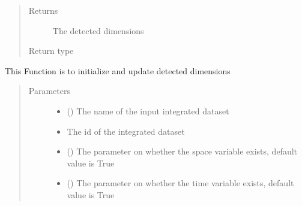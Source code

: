 \documentclass[letterpaper,10pt,english]{sphinxmanual}
\begin{document}
\begin{fulllineitems}
\begin{fulllineitems}
\begin{quote}
\begin{description}
\begin{itemize}
\end{itemize}

\item[{Returns}] \leavevmode
The detected dimensions

\item[{Return type}] \leavevmode
{}

\end{description}\end{quote}

\end{fulllineitems}


\begin{fulllineitems}
\label{\detokenize{AgentTools.util:AgentTools.util.OutputUtil.OutputUtil.check_dimensions_var}}
This Function is to initialize and update detected dimensions
\begin{quote}\begin{description}
\item[{Parameters}] \leavevmode\begin{itemize}
\item {} 
 () \textendash{} The name of the input integrated dataset

\item {} 
 \textendash{} The id of the integrated dataset

\item {} 
 () \textendash{} The parameter on whether the space variable exists, default value is True

\item {} 
 () \textendash{} The parameter on whether the time variable exists, default value is True


\end{itemize}
\end{description}
\end{quote}
\end{fulllineitems}
\end{fulllineitems}
\end{document}
